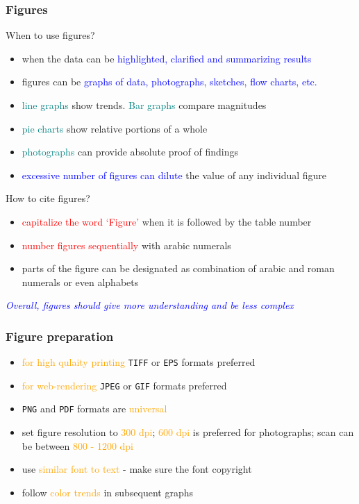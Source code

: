 \documentclass[newPxFont,sthlmFooter]{beamer}
\newcommand{\fs}{\footnotesize}
\begin{document}
\begin{frame}\frametitle{Figures}
\vspace{-0.75cm}
\begin{exampleblock}{\small When to use figures?}
  \begin{itemize}
  \fs
  \item when the data can be \textcolor{blue}{highlighted, clarified and summarizing results}
  \item figures can be \textcolor{blue}{graphs of data, photographs, sketches, flow charts, etc.}
  \item \textcolor{teal}{line graphs} show trends. \textcolor{teal}{Bar graphs} compare magnitudes
  \item \textcolor{teal}{pie charts} show relative portions of a whole
  \item \textcolor{teal}{photographs} can provide absolute proof of findings
  \item \textcolor{blue}{excessive number of figures can dilute} the value of any individual figure
  \end{itemize}
\end{exampleblock}

\begin{alertblock}{\small How to cite figures?}
  \begin{itemize}
  \fs
  \item \textcolor{red}{capitalize the word `Figure'} when it is followed by the table number
  \item \textcolor{red}{number figures sequentially} with arabic numerals
  \item parts of the figure can be designated as combination of arabic and roman numerals or even alphabets
  \end{itemize}
\end{alertblock}
\vspace{-0.5cm}
\begin{center}
\textcolor{blue}{\fs \it Overall, figures should give more understanding and be less complex}
\end{center}
\end{frame}

\begin{frame}\frametitle{Figure preparation}
  \begin{itemize}
  \fs
  \item \textcolor{orange}{for high qulaity printing} \texttt{TIFF} or \texttt{EPS} formats preferred
  \item \textcolor{orange}{for web-rendering} \texttt{JPEG} or \texttt{GIF} formats preferred
  \item \texttt{PNG} and \texttt{PDF} formats are \textcolor{orange}{universal}
  \item set figure resolution to \textcolor{orange}{300 dpi}; \textcolor{orange}{600 dpi} is preferred for photographs; scan can be between \textcolor{orange}{800 - 1200 dpi}
  \item use \textcolor{orange}{similar font to text} - make sure the font copyright
  \item follow \textcolor{orange}{color trends} in subsequent graphs
  \end{itemize}
\end{frame}
\end{document}
